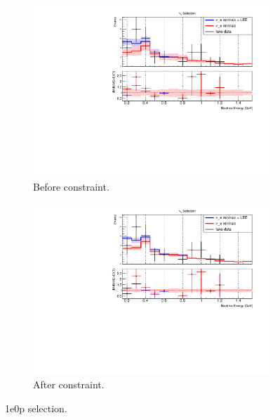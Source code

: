 \begin{figure}[H] 
\begin{center}
    \begin{subfigure}[b]{0.45\textwidth}
    \centering
    \includegraphics[width=1.00\textwidth]{Fakedata/set3/1e0p_numu_reco_e_H1_mc_fakedata_set3_nue_before_data_constraint.pdf}
    \caption{\label{fig:fakedata:set3:zp_before_constrain} Before constraint.}
    \end{subfigure}
    \begin{subfigure}[b]{0.45\textwidth}
    \centering
    \includegraphics[width=1.00\textwidth]{Fakedata/set3/1e0p_numu_reco_e_H1_mc_fakedata_set3_univ_overlay_nue.pdf}
    \caption{\label{fig:fakedata:set3:zp_after_constrain} After constraint.}
    \end{subfigure}
\caption{\label{fig:fakedata:set3:zp_const} 1e0p selection.}
\end{center}
\end{figure}


